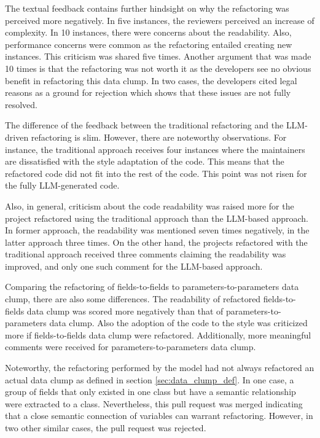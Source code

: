 The textual feedback contains further hindsight on why the refactoring was perceived more negatively. In five instances, the reviewers perceived an increase of complexity. In 10 instances, there were concerns about the readability. Also, performance concerns were common as the refactoring entailed creating new instances. This criticism was shared five times. Another argument that was made 10 times is that the refactoring was not worth it as the developers see no obvious benefit in refactoring this data clump. In two cases, the developers cited legal reasons as a ground for rejection which shows that these issues are not fully resolved.

The difference of the feedback between the traditional refactoring and the \ac{LLM}-driven refactoring is slim. However, there are noteworthy observations. For instance, the traditional approach receives four instances where the maintainers are dissatisfied with the style adaptation of  the code. This means that the refactored code did not fit into the rest of the code. This point was not risen for the fully \ac{LLM}-generated code. 

Also, in general, criticism about the code readability was raised more for the project refactored using the traditional approach than the \ac{LLM}-based approach. In former approach, the readability was mentioned seven times negatively, in the latter approach three times. On the other hand, the projects refactored with the traditional approach received three comments claiming the readability was improved, and only one such comment for the \ac{LLM}-based approach. 

Comparing the refactoring of fields-to-fields to parameters-to-parameters data clump, there are also some differences. The readability of refactored fields-to-fields data clump was  scored more negatively than that of parameters-to-parameters data clump. Also the adoption of the code to the style was criticized more if fields-to-fields data clump were refactored. Additionally, more meaningful comments were received for parameters-to-parameters data clump.

Noteworthy, the refactoring performed by the model had not always refactored an actual data clump as defined in section \ref{sec:data_clump_def}. In one case, a group of fields that only existed in one class but have a semantic relationship were extracted to a class. Nevertheless, this pull request was merged indicating that a close semantic connection of variables can warrant refactoring. However, in two other similar cases, the pull request was rejected. 

